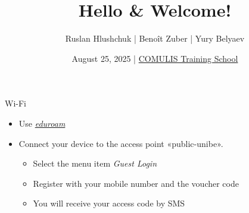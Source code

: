 \documentclass[aspectratio=169,12pt]{beamer}
\title{Hello \& Welcome!}
\author{Ruslan Hlushchuk | Benoît Zuber | Yury Belyaev}
\institute{Institute of Anatomy}
\date{August 25, 2025 | \href{https://www.ana.unibe.ch/weiterbildung/comulis_training_school/}
{COMULIS Training School}}
\begin{document}
\begin{frame}
  \titlepage
\end{frame}

\begin{frame}{Wi-Fi}
	\begin{itemize}
		\item Use \emph{\href{https://www.eduroam.org/}{eduroam}}
		\item Connect your device to the access point «public-unibe».
		\begin{itemize}
			\item Select the menu item \emph{Guest Login}
			\item Register with your mobile number and the voucher code
\begin{tcolorbox}[width=4cm,colframe=ubRed,title=Voucher code]
				
			\end{tcolorbox}
			\item You will receive your access code by SMS
		\end{itemize}
	\end{itemize}
\end{frame}
\end{document}
